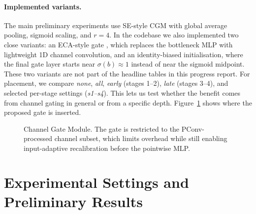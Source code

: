 \documentclass{article}
\begin{document}
\paragraph{Implemented variants.} The main preliminary experiments use SE-style CGM with global average pooling, sigmoid scaling, and $r{=}4$. In the codebase we also implemented two close variants: an ECA-style gate \citep{wang2020eca}, which replaces the bottleneck MLP with lightweight 1D channel convolution, and an identity-biased initialisation, where the final gate layer starts near $\sigma(b)\!\approx\!1$ instead of near the sigmoid midpoint. These two variants are not part of the headline tables in this progress report. For placement, we compare \emph{none}, \emph{all}, \emph{early} (stages 1--2), \emph{late} (stages 3--4), and selected per-stage settings (\emph{s1--s4}). This lets us test whether the benefit comes from channel gating in general or from a specific depth. Figure~\ref{fig:cgm} shows where the proposed gate is inserted.

\begin{figure}[t]
\centering
{}
\caption{Channel Gate Module. The gate is restricted to the PConv-processed channel subset, which limits overhead while still enabling input-adaptive recalibration before the pointwise MLP.}
\label{fig:cgm}
\end{figure}

\section{Experimental Settings and Preliminary Results}
\end{document}
